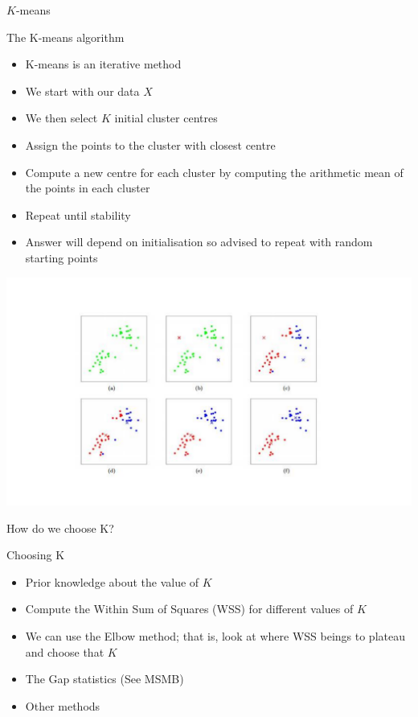 \documentclass{bredelebeamer}
\begin{document}
\begin{frame}{$K$-means}
	\begin{exampleblock}{The K-means algorithm}
		
		\begin{itemize}
		\item K-means is an iterative method
		\item We start with our data $X$
		\item We then select $K$ initial cluster centres
		\item Assign the points to the cluster with closest centre
		\item Compute a new centre for each cluster by computing the arithmetic mean of the points in each cluster
		\item Repeat until stability
		\item Answer will depend on initialisation so advised to repeat with random starting points
		\end{itemize}

	\end{exampleblock}

\end{frame}

\begin{frame}
\includegraphics[width = 1\textwidth]{kmeans}
\end{frame}

\begin{frame}{How do we choose K?}
\begin{exampleblock}{Choosing K}
	\begin{itemize}
		\item Prior knowledge about the value of $K$
		\item Compute the Within Sum of Squares (WSS) for different values of $K$
		\item We can use the Elbow method; that is, look at where WSS beings to plateau and choose that $K$
		\item The Gap statistics (See MSMB)
		\item Other methods
	\end{itemize}
\end{exampleblock}
\end{frame}
\end{document}

